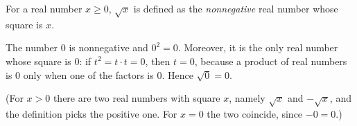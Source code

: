 For a real number $x\ge0$, $\sqrt x$ is defined as the \emph{nonnegative} real number whose square is $x$.

The number $0$ is nonnegative and $0^2=0$. Moreover, it is the only real number whose square is $0$: if $t^2=t\cdot t=0$, then $t=0$, because a product of real numbers is $0$ only when one of the factors is $0$. Hence $\sqrt0=\boxed{0}$.

(For $x>0$ there are two real numbers with square $x$, namely $\sqrt x$ and $-\sqrt x$, and the definition picks the positive one. For $x=0$ the two coincide, since $-0=0$.)
